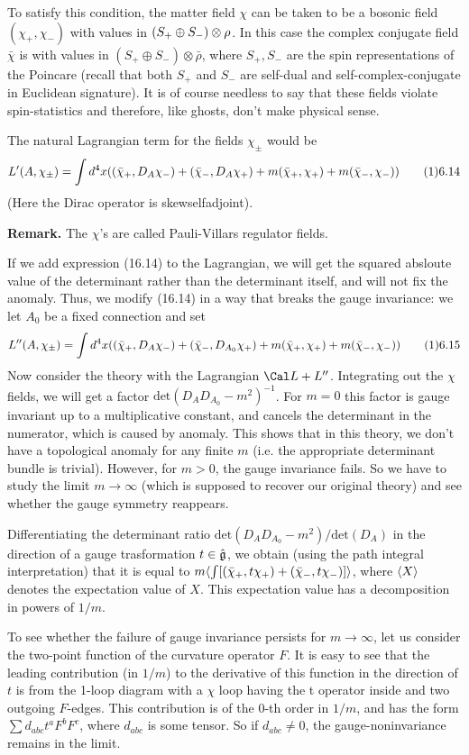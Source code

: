 To satisfy this condition, the matter field $\chi$ can be taken to 
be a bosonic field $(\chi_+,\chi_-)$
with values in $(S_+\oplus S_-)\otimes \rho$. In this case  
the complex conjugate field $\bar\chi$ is with values in 
$(S_+\oplus S_-)\otimes \bar\rho$, where $S_+,S_-$ are the spin 
representations of the Poincare
(recall that both $S_+$ and $S_-$ are self-dual and self-complex-conjugate
in Euclidean signature). 
It is of course needless to say that these fields violate spin-statistics and 
therefore, like ghosts, don't make physical sense. 

The natural 
Lagrangian term for the fields $\chi_\pm$  
would be 
$$
L'(A,\chi_\pm)=\int d^4x ((\bar\chi_+, D_A\chi_-)+(\bar\chi_-,D_A\chi_+)+
m(\bar\chi_+,\chi_+)+m(\bar\chi_-,\chi_-))  \tag 16.14
$$
(Here the Dirac operator is skewselfadjoint). 

{\bf Remark.} The $\chi$'s are called
Pauli-Villars regulator fields. 

If we add
expression (16.14) to the Lagrangian, we will get the squared absloute 
value of the determinant rather than the determinant itself, and will not fix 
the anomaly. Thus, we modify (16.14) in a way that breaks the gauge 
invariance:  we let $A_0$ be a fixed connection and set 
$$
L''(A,\chi_\pm)=\int d^4x ((\bar\chi_+,D_A\chi_-)+(\bar\chi_- ,D_{A_0}\chi_+)+
m(\bar\chi_+,\chi_+)+m(\bar\chi_-,\chi_-))  \tag 16.15
$$
Now consider the theory with the Lagrangian $\Cal L+L''$. 
Integrating out the $\chi$ fields, we will get a factor 
$\text{det}(D_AD_{A_0}-m^2)^{-1}$. For $m=0$ this factor
is gauge invariant up to a multiplicative constant, and cancels 
the determinant in the numerator, which is caused by anomaly. 
This shows that in this theory, we don't have a topological anomaly 
for any finite $m$ (i.e. the appropriate determinant bundle is trivial). 
However, for $m>0$, the gauge invariance fails. So we have to 
study the limit $m\to \infty$ (which is supposed to recover our original 
theory) and see whether the gauge symmetry reappears. 

Differentiating the determinant ratio
$\text{det}(D_AD_{A_0}-m^2)/\text{det}(D_A)$
in the direction of a gauge trasformation $t\in \hat {\frak g}$, 
we obtain (using the path integral interpretation)
that it is equal to $m\langle\int [(\bar\chi_+,t\chi_+)+(\bar\chi_-,t\chi_-)]\rangle$,
where $\langle X\rangle$ denotes the expectation value of $X$. 
This expectation value has a decomposition in powers of $1/m$.
 
To see whether the failure of gauge invariance 
persists for $m\to\infty$, let us consider 
the two-point function of the curvature operator $F$. 
It is easy to see that the leading contribution (in $1/m$) to the derivative 
of this function in the direction of $t$ is from the 1-loop diagram
with a $\chi$ loop having the t operator inside and two outgoing $F$-edges. 
This contribution is of the 0-th order in $1/m$, and has the form 
$\sum d_{abc}t^aF^bF^c$, where $d_{abc}$ is some tensor. So if $d_{abc}\ne 0$, 
the gauge-noninvariance remains in the limit. 


